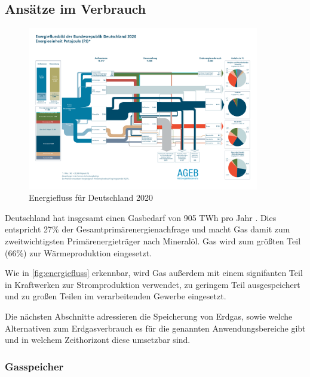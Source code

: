 \subsection{Ansätze im Verbrauch}

\begin{figure}[h]
\centering
\includegraphics[width=0.9\textwidth]{../fig/Energieflussbild-2020_PJ_lang_DE_20220401.pdf}
\caption{Energiefluss für Deutschland 2020 \cite{energieflussbild}}
\label{fig:energiefluss}
\end{figure}

Deutschland hat insgesamt einen Gasbedarf von 905 TWh pro Jahr \cite{clausen2022}. Dies entspricht 27\% der Gesamtprimärenergienachfrage und macht Gas damit zum zweitwichtigsten Primärenergieträger nach Mineralöl. Gas wird zum größten Teil (66\%) zur Wärmeproduktion eingesetzt. 

Wie in \autoref{fig:energiefluss} erkennbar, wird Gas außerdem mit einem signifanten Teil in Kraftwerken zur Stromproduktion verwendet, zu geringem Teil ausgespeichert und zu großen Teilen im verarbeitenden Gewerbe eingesetzt. 

Die nächsten Abschnitte adressieren die Speicherung von Erdgas, sowie welche Alternativen zum Erdgasverbrauch es für die genannten Anwendungsbereiche gibt und in welchem Zeithorizont diese umsetzbar sind.

\subsubsection{Gasspeicher}

